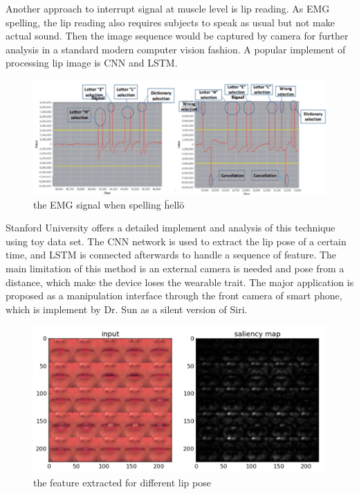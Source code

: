 \documentclass[a4paper]{article}
\begin{document}
Another approach to interrupt signal at muscle level is lip reading. As EMG spelling, the lip reading also requires subjects to speak as usual but not make actual sound. Then the image sequence would be captured by camera for further analysis in a standard modern computer vision fashion. A popular implement of processing lip image is CNN and LSTM. 

\begin{figure}
	\centering
	\includegraphics[width= \linewidth]{EMGSpell}
	\caption{the EMG signal when spelling \"hello\"}
	\label{fig:EMG}
\end{figure}

Stanford University offers a detailed implement \autocite{garg2016lip} and analysis of this technique using toy data set. The CNN network is used to extract the lip pose of a certain time, and LSTM is connected afterwards to handle a sequence of feature. The main limitation of this method is an external camera is needed and pose from a distance, which make the device loses the wearable trait. The major application is proposed as a manipulation interface through the front camera of smart phone, which is implement by Dr. Sun as a silent version of Siri.\autocite{sun2018lip} 

\begin{figure}
	\centering
	\includegraphics[width= \linewidth]{Lip}
	\caption{the feature extracted for different lip pose}
	\label{fig:lip}
\end{figure}
\end{document}
